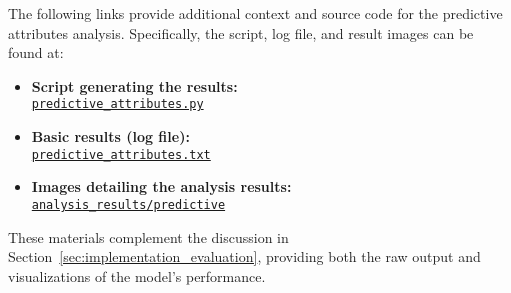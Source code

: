 \documentclass[runningheads]{llncs}
\begin{document}
The following links provide additional context and source code for the predictive attributes analysis. Specifically, the script, log file, and result images can be found at:

\begin{itemize}
    \item \textbf{Script generating the results:}\\
    \href{https://github.com/gjrich/ms-capstone/blob/master/problems/predictive\_attributes.py}{\texttt{predictive\_attributes.py}}

    \item \textbf{Basic results (log file):}\\
    \href{https://github.com/gjrich/ms-capstone/blob/master/problems/predictive\_attributes.txt}{\texttt{predictive\_attributes.txt}}

    \item \textbf{Images detailing the analysis results:}\\
    \href{https://github.com/gjrich/ms-capstone/tree/master/problems/analysis\_results/predictive}{\texttt{analysis\_results/predictive}}
\end{itemize}

These materials complement the discussion in Section~\ref{sec:implementation_evaluation}, providing both the raw output and visualizations of the model’s performance.






%
%
%
%
\end{document}
